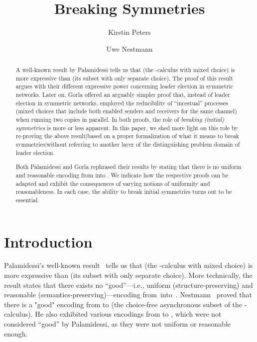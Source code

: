 \documentclass[11pt,techReport]{eptcs}
\title{Breaking Symmetries}
\author{Kirstin Peters
\institute{Technische Universit\"at Berlin, Germany}
\email{kirstin.peters@tu-berlin.de}
\and
Uwe Nestmann
\institute{Technische Universit\"at Berlin, Germany}
\email{uwe.nestmann@tu-berlin.de}
}
\begin{document}
\maketitle

\begin{abstract}
A well-known result by Palamidessi tells us that \pimix (the -calculus with mixed choice) is more expressive than \pisep (its subset with only separate choice).  The proof of this result argues with their different expressive power concerning leader election in symmetric networks.  Later on, Gorla offered an arguably simpler proof that, instead of leader election in symmetric networks, employed the reducibility of ``incestual'' processes (mixed choices that include both enabled senders and receivers for the same channel) when running two copies in parallel.  In both proofs, the role of \emph{breaking (initial) symmetries} is more or less apparent.  In this paper, we shed more light on this role by re-proving the above result|based on a proper formalization of what it means to break symmetries|without referring to another layer of the distinguishing problem domain of leader election.

Both Palamidessi and Gorla rephrased their results by stating that there is no uniform and reasonable encoding from \pimix into \pisep.  We indicate how the respective proofs can be adapted and exhibit the consequences of varying notions of uniformity and reasonableness.  In each case, the ability to break initial symmetries turns out to be essential.
\end{abstract}

\section{Introduction}

Palamidessi's well-known result~\cite{palamidessi03} tells us that \pimix (the -calculus with mixed choice) is more expressive than \pisep (its subset with only separate choice).
More technically, the result states that there exists no ``good''---i.e., uniform (structure-preserving) and reasonable (semantics-preserving)---encoding from~\pimix into~\pisep.  Nestmann~\cite{nestmann00} proved that there is a "good" encoding from \pisep to \piasyn (the choice-free asynchronous subset of the -calculus).  He also exhibited various encodings from  \pimix to \pisep, which were not considered ``good'' by Palamidessi, as they were not uniform or reasonable enough.
\end{document}
